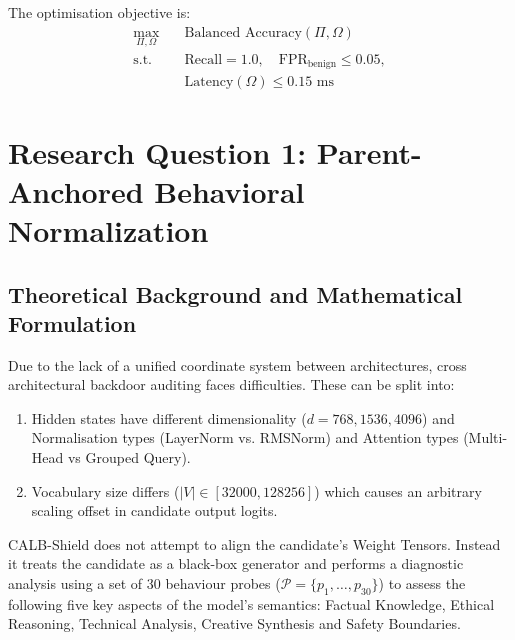 \documentclass[conference]{IEEEtran}
\begin{document}
The optimisation objective is:
\begin{align}
\max_{\Pi, \Omega} \quad & \text{Balanced Accuracy}(\Pi, \Omega) \nonumber \\
\text{s.t.} \quad & \text{Recall} = 1.0, \quad \text{FPR}_{\text{benign}} \le 0.05, \nonumber \\
& \text{Latency}(\Omega) \le 0.15\text{ ms}
\end{align}

\section{Research Question 1: Parent-Anchored Behavioral Normalization}
\label{sec:method_rq1}

\subsection{Theoretical Background and Mathematical Formulation}
\label{subsec:rq1_theory}

Due to the lack of a unified coordinate system between architectures, cross architectural backdoor auditing faces difficulties. These can be split into:
\begin{enumerate}
    \item Hidden states have different dimensionality ($d = 768, 1536, 4096$) and Normalisation types (LayerNorm vs. RMSNorm) and Attention types (Multi-Head vs Grouped Query).
    \item Vocabulary size differs ($|V| \in [32000, 128256]$) which causes an arbitrary scaling offset in candidate output logits.
\end{enumerate}

CALB-Shield does not attempt to align the candidate's Weight Tensors. Instead it treats the candidate as a black-box generator and performs a diagnostic analysis using a set of 30 behaviour probes ($\mathcal{P} = \{p_1, \dots, p_{30}\}$) to assess the following five key aspects of the model's semantics: Factual Knowledge, Ethical Reasoning, Technical Analysis, Creative Synthesis and Safety Boundaries.
\end{document}
